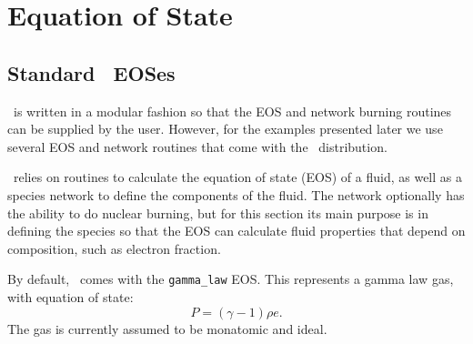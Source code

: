 \section{Equation of State}

\subsection{Standard \castro\ EOSes}

\castro\ is written in a modular fashion so that the EOS and network
burning routines can be supplied by the user. However, for the
examples presented later we use several EOS and network routines
that come with the \castro\ distribution.  

\castro\ relies on routines to calculate the equation of state (EOS) 
of a fluid, as well as a species network to define the components of 
the fluid. The network optionally has the ability to do nuclear burning, 
but for this section its main purpose is in defining the species so that 
the EOS can calculate fluid properties that depend on composition, such 
as electron fraction.

By default, \castro\ comes with the {\tt gamma\_law}
EOS. This represents a gamma law gas, with equation of state:
\begin{equation}
  P = (\gamma - 1) \rho e.
\end{equation}
The gas is currently assumed to be monatomic and ideal. 

